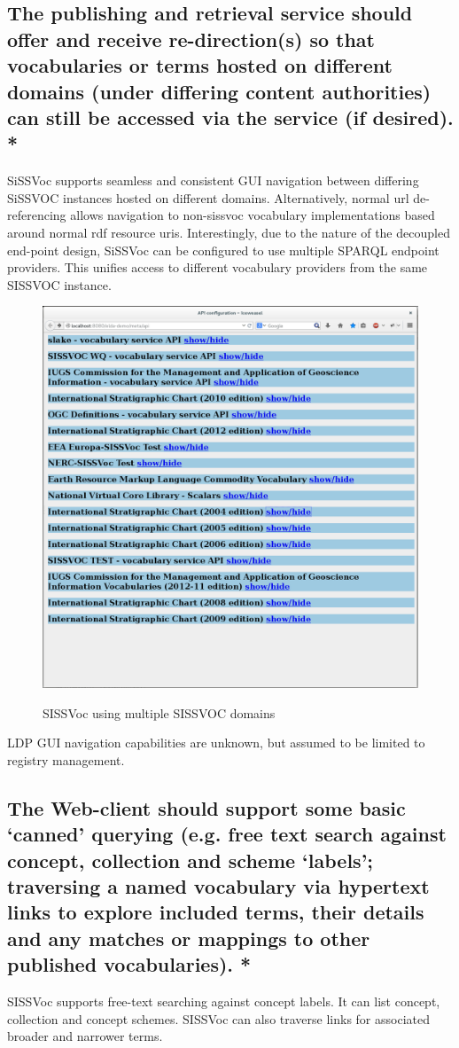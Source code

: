 \documentclass[10pt,a4paper]{article}
\begin{document}
\begin{flushleft}
\subsection{ The publishing and retrieval service should offer and receive
re-direction(s) so that vocabularies or terms hosted on different domains (under
differing content authorities) can still be accessed via the service (if
desired). * }

{
SiSSVoc supports seamless and consistent GUI navigation between differing
SiSSVOC instances hosted on different domains.
%
Alternatively, normal url de-referencing allows navigation to non-sissvoc
vocabulary implementations based around normal rdf resource uris.
%
Interestingly, due to the nature of the decoupled end-point design, SiSSVoc 
can be configured to use multiple SPARQL endpoint providers. This unifies access
to different vocabulary providers from the same SISSVOC instance. 

\begin{figure}[H]
\centering
\caption{SISSVoc using multiple SISSVOC domains}
\includegraphics[width=12cm]{multipleendpoints}  
\label{fig:test}
\end{figure}

LDP GUI navigation capabilities are unknown, but assumed to be limited to 
registry management.
}
%
%
\subsection{ The Web-client should support some basic ‘canned’ querying (e.g.
free text search against concept, collection and scheme ‘labels’; traversing a
named vocabulary via hypertext links to explore included terms, their details
and any matches or mappings to other published vocabularies). * }
%
SISSVoc supports free-text searching against concept labels. It can list
concept, collection and concept schemes. SISSVoc can also traverse links 
for associated broader and narrower terms. 


\end{flushleft}
\end{document}
